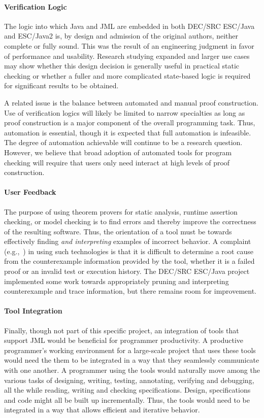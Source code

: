 \documentclass{llncs}
\begin{document}
\paragraph*{Verification Logic} The logic into which Java and JML are
embedded in both DEC/SRC ESC/Java and ESC/Java2 is, by design and
admission of the original authors, neither complete or fully sound.
This was the result of an engineering judgment in favor of performance
and usability.  Research studying expanded and larger use cases may
show whether this design decision is generally useful in practical
static checking or whether a fuller and more complicated state-based
logic is required for significant results to be obtained.

A related issue is the balance between automated and manual proof
construction.  Use of verification logics will likely be limited to
narrow specialties as long as proof construction is a major component
of the overall programming task.  Thus, automation is essential,
though it is expected that full automation is infeasible.  The degree
of automation achievable will continue to be a research question.
However, we believe that broad adoption of automated tools for program
checking will require that users only need interact at high levels of
proof construction.

\paragraph*{User Feedback} The purpose of using theorem provers for
static analysis, runtime assertion checking, or model checking is to
find errors and thereby improve the correctness of the resulting
software.  Thus, the orientation of a tool must be towards effectively
finding \emph{and interpreting} examples of incorrect behavior.  A
complaint (e.g.,~\cite{GroceVisser03}) in using such technologies is
that it is difficult to determine a root cause from the counterexample
information provided by the tool, whether it is a failed proof or an
invalid test or execution history.  The DEC/SRC ESC/Java project
implemented some work towards appropriately pruning and interpreting
counterexample and trace information, but there remains room for
improvement.

\paragraph*{Tool Integration} Finally, though not part of this specific
project, an integration of tools that support JML would be beneficial
for programmer productivity.  A productive programmer's working
environment for a large-scale project that uses these tools would need
the them to be integrated in a way that they seamlessly communicate
with one another.  A programmer using the tools would naturally move
among the various tasks of designing, writing, testing, annotating,
verifying and debugging, all the while reading, writing and checking
specifications.  Design, specifications and code might all be built up
incrementally.  Thus, the tools would need to be integrated in a way
that allows efficient and iterative behavior.
\end{document}
